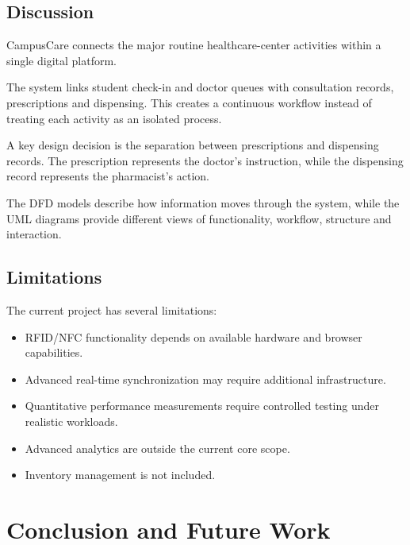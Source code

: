 \documentclass{tietreport}
\begin{document}
\section{Discussion}

CampusCare connects the major routine healthcare-center activities
within a single digital platform.

The system links student check-in and doctor queues with consultation
records, prescriptions and dispensing. This creates a continuous
workflow instead of treating each activity as an isolated process.

A key design decision is the separation between prescriptions and
dispensing records. The prescription represents the doctor's
instruction, while the dispensing record represents the pharmacist's
action.

The DFD models describe how information moves through the system,
while the UML diagrams provide different views of functionality,
workflow, structure and interaction.

\section{Limitations}

The current project has several limitations:

\begin{itemize}

    \item RFID/NFC functionality depends on available hardware and
    browser capabilities.

    \item Advanced real-time synchronization may require additional
    infrastructure.

    \item Quantitative performance measurements require controlled
    testing under realistic workloads.

    \item Advanced analytics are outside the current core scope.

    \item Inventory management is not included.

\end{itemize}



\chapter{Conclusion and Future Work}
\end{document}
